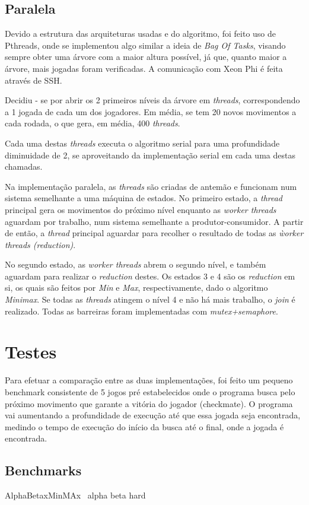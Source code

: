 \documentclass[12pt,a4paper,final]{article}
\begin{document}
\subsection{Paralela}

Devido a estrutura das arquiteturas usadas e do algoritmo, foi feito uso de Pthreads, onde se implementou algo similar a ideia de \textit{Bag Of Tasks}, visando sempre obter uma árvore com a maior altura possível, já que, quanto maior a árvore, mais jogadas foram verificadas. A comunicação com Xeon Phi é feita através de SSH.

Decidiu - se por abrir os 2 primeiros níveis da árvore em \textit{threads}, correspondendo a 1 jogada de cada um dos jogadores. Em média, se tem 20 novos movimentos a cada rodada, o que gera, em média, 400 \textit{threads}.

Cada uma destas \textit{threads} executa o algoritmo serial para uma profundidade diminuidade de 2, se aproveitando da implementação serial em cada uma destas chamadas.

Na implementação paralela, as \textit{threads} são criadas de antemão e funcionam num sistema semelhante a uma máquina de estados. No primeiro estado, a \textit{thread} principal gera os movimentos do próximo nível enquanto as \textit{worker threads} aguardam por trabalho, num sistema semelhante a produtor-consumidor. A partir de então, a \textit{thread} principal aguardar para recolher o resultado de todas as \textit{ẁorker threads (reduction)}.

No segundo estado, as \textit{worker threads} abrem o segundo nível, e também aguardam para realizar o \textit{reduction} destes. Os estados 3 e 4 são os \textit{reduction} em si, os quais são feitos por \textit{Min} e \textit{Max}, respectivamente, dado o algoritmo \textit{Minimax}. Se todas as \textit{threads} atingem o nível 4 e não há mais trabalho, o \textit{join} é realizado. Todas as barreiras foram implementadas com \textit{mutex+semaphore}.

\section{Testes}

Para efetuar a comparação entre as duas implementações, foi feito um pequeno benchmark consistente de 5 jogos pré estabelecidos onde o programa busca pelo próximo movimento que garante a vitória do jogador (checkmate). O programa vai aumentando a profundidade de execução até que essa jogada seja encontrada, medindo o tempo de execução do início da busca até o final, onde a jogada é encontrada.

\subsection{Benchmarks}

AlphaBetaxMinMAx~\cite{chess2}
alpha beta hard~\cite{chess1}

%  


\end{document}
